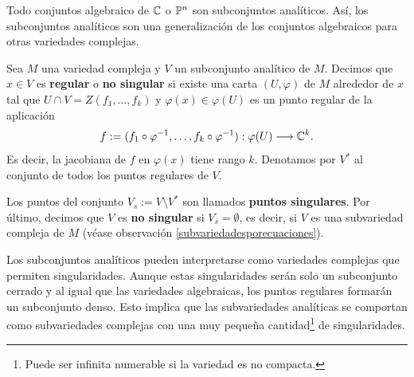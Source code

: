     Todo conjuntos algebraico de $\mathbb{C}$ o $\mathbb{P}^n$ son subconjuntos analíticos. Así, los subconjuntos analíticos son una generalización de los conjuntos algebraicos para otras variedades complejas.
    
    \begin{definition}[No singular]
    	Sea $M$ una variedad compleja y $V$ un subconjunto analítico de $M$. Decimos que $x\in V$ es \textbf{regular} o \textbf{no singular} si existe una carta $(U,\varphi)$ de $M$ alrededor de $x$ tal que $U\cap V=Z(f_1,\dots,f_k)$ y $\varphi(x)\in \varphi(U)$ es un punto regular de la aplicación
    	\begin{equation*}
    		f:=(f_1\circ\varphi^{-1},\dots,f_k\circ\varphi^{-1}):\varphi(U)\longrightarrow \mathbb{C}^k.
    	\end{equation*}
    	Es decir, la jacobiana de $f$ en $\varphi(x)$ tiene rango $k$. Denotamos por $V^*$ al conjunto de todos los puntos regulares de $V$.
    	
    	Los puntos del conjunto $V_s:=V\setminus V^*$ son llamados \textbf{puntos singulares}. Por último, decimos que $V$ es \textbf{no singular} si $V_s=\emptyset$, es decir, si $V$ es una subvariedad compleja de $M$ (véase observación \ref{subvariedadesporecuaciones}).
    \end{definition}
    
    Los subconjuntos analíticos pueden interpretarse como variedades complejas que permiten singularidades. Aunque estas singularidades serán solo un subconjunto cerrado y al igual que las variedades algebraicas, los puntos regulares formarán un subconjunto denso. Esto implica que las subvariedades analíticas se comportan como subvariedades complejas con una muy pequeña cantidad\footnote{Puede ser infinita numerable si la variedad es no compacta.} de singularidades.
    
